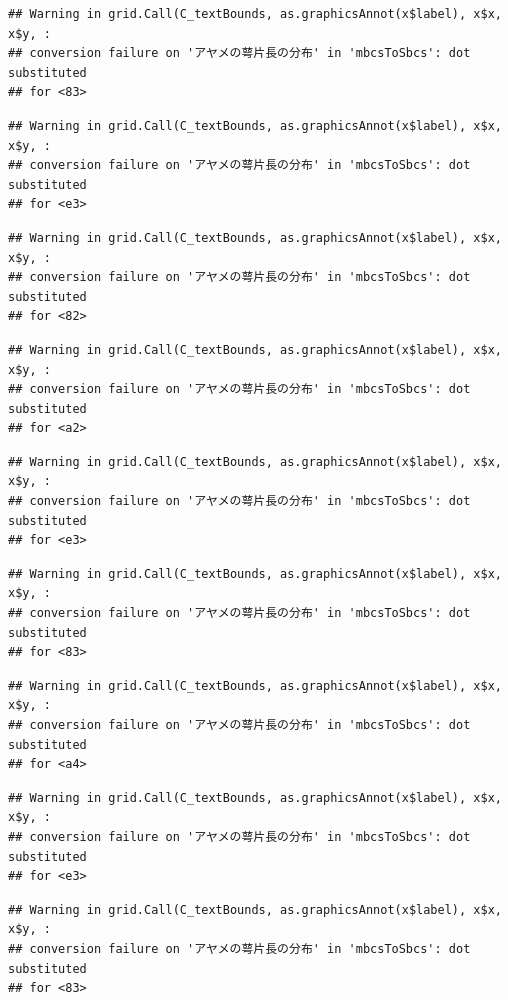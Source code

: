 \documentclass[
]{book}
\begin{document}
\begin{verbatim}
## Warning in grid.Call(C_textBounds, as.graphicsAnnot(x$label), x$x, x$y, :
## conversion failure on 'アヤメの萼片長の分布' in 'mbcsToSbcs': dot substituted
## for <83>
\end{verbatim}

\begin{verbatim}
## Warning in grid.Call(C_textBounds, as.graphicsAnnot(x$label), x$x, x$y, :
## conversion failure on 'アヤメの萼片長の分布' in 'mbcsToSbcs': dot substituted
## for <e3>
\end{verbatim}

\begin{verbatim}
## Warning in grid.Call(C_textBounds, as.graphicsAnnot(x$label), x$x, x$y, :
## conversion failure on 'アヤメの萼片長の分布' in 'mbcsToSbcs': dot substituted
## for <82>
\end{verbatim}

\begin{verbatim}
## Warning in grid.Call(C_textBounds, as.graphicsAnnot(x$label), x$x, x$y, :
## conversion failure on 'アヤメの萼片長の分布' in 'mbcsToSbcs': dot substituted
## for <a2>
\end{verbatim}

\begin{verbatim}
## Warning in grid.Call(C_textBounds, as.graphicsAnnot(x$label), x$x, x$y, :
## conversion failure on 'アヤメの萼片長の分布' in 'mbcsToSbcs': dot substituted
## for <e3>
\end{verbatim}

\begin{verbatim}
## Warning in grid.Call(C_textBounds, as.graphicsAnnot(x$label), x$x, x$y, :
## conversion failure on 'アヤメの萼片長の分布' in 'mbcsToSbcs': dot substituted
## for <83>
\end{verbatim}

\begin{verbatim}
## Warning in grid.Call(C_textBounds, as.graphicsAnnot(x$label), x$x, x$y, :
## conversion failure on 'アヤメの萼片長の分布' in 'mbcsToSbcs': dot substituted
## for <a4>
\end{verbatim}

\begin{verbatim}
## Warning in grid.Call(C_textBounds, as.graphicsAnnot(x$label), x$x, x$y, :
## conversion failure on 'アヤメの萼片長の分布' in 'mbcsToSbcs': dot substituted
## for <e3>
\end{verbatim}

\begin{verbatim}
## Warning in grid.Call(C_textBounds, as.graphicsAnnot(x$label), x$x, x$y, :
## conversion failure on 'アヤメの萼片長の分布' in 'mbcsToSbcs': dot substituted
## for <83>
\end{verbatim}
\end{document}
